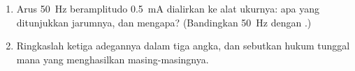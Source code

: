 \begin{problem}
\begin{enumerate}[resume]
        skalanya tak lagi linear: tuliskan syarat kesetimbangannya
        dengan $\theta$ diukur dari kedudukan yang padanya bidang kumparannya
        memuat $\vect B$.
  \item Arus \qty{50}{Hz} beramplitudo \qty{0.5}{mA} dialirkan ke
        alat ukurnya: apa yang ditunjukkan jarumnya, dan mengapa? (Bandingkan \qty{50}{Hz}
        dengan .)
  \item Ringkaslah ketiga adegannya dalam tiga angka, dan sebutkan hukum tunggal
        mana yang menghasilkan masing-masingnya.
\end{enumerate}
\end{problem}
